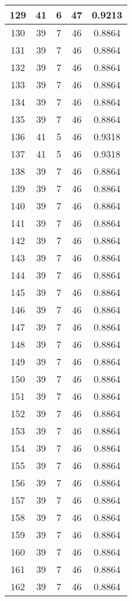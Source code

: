 \documentclass[letterpaper, 12pt]{article}
\begin{document}
\begin{longtable}{|c|c|c|c|c|}
\hline
129 & 41 & 6 & 47 & 0.9213 \\
\hline
130 & 39 & 7 & 46 & 0.8864 \\
\hline
131 & 39 & 7 & 46 & 0.8864 \\
\hline
132 & 39 & 7 & 46 & 0.8864 \\
\hline
133 & 39 & 7 & 46 & 0.8864 \\
\hline
134 & 39 & 7 & 46 & 0.8864 \\
\hline
135 & 39 & 7 & 46 & 0.8864 \\
\hline
136 & 41 & 5 & 46 & 0.9318 \\
\hline
137 & 41 & 5 & 46 & 0.9318 \\
\hline
138 & 39 & 7 & 46 & 0.8864 \\
\hline
139 & 39 & 7 & 46 & 0.8864 \\
\hline
140 & 39 & 7 & 46 & 0.8864 \\
\hline
141 & 39 & 7 & 46 & 0.8864 \\
\hline
142 & 39 & 7 & 46 & 0.8864 \\
\hline
143 & 39 & 7 & 46 & 0.8864 \\
\hline
144 & 39 & 7 & 46 & 0.8864 \\
\hline
145 & 39 & 7 & 46 & 0.8864 \\
\hline
146 & 39 & 7 & 46 & 0.8864 \\
\hline
147 & 39 & 7 & 46 & 0.8864 \\
\hline
148 & 39 & 7 & 46 & 0.8864 \\
\hline
149 & 39 & 7 & 46 & 0.8864 \\
\hline
150 & 39 & 7 & 46 & 0.8864 \\
\hline
151 & 39 & 7 & 46 & 0.8864 \\
\hline
152 & 39 & 7 & 46 & 0.8864 \\
\hline
153 & 39 & 7 & 46 & 0.8864 \\
\hline
154 & 39 & 7 & 46 & 0.8864 \\
\hline
155 & 39 & 7 & 46 & 0.8864 \\
\hline
156 & 39 & 7 & 46 & 0.8864 \\
\hline
157 & 39 & 7 & 46 & 0.8864 \\
\hline
158 & 39 & 7 & 46 & 0.8864 \\
\hline
159 & 39 & 7 & 46 & 0.8864 \\
\hline
160 & 39 & 7 & 46 & 0.8864 \\
\hline
161 & 39 & 7 & 46 & 0.8864 \\
\hline
162 & 39 & 7 & 46 & 0.8864 \\

\end{longtable}
\end{document}
